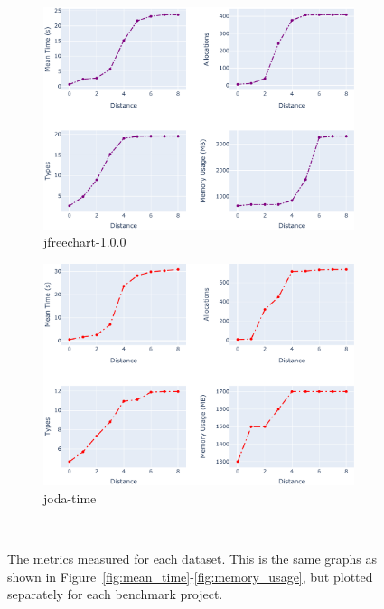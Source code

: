 \begin{figure}[htbp]
\begin{subfigure}[b]{0.45\textwidth}
\captionsetup{margin=0cm}  %
\includegraphics[width=\textwidth]{figures/jfreechart-1.0.0_distance_evaluation.pdf}
\caption{jfreechart-1.0.0}
\end{subfigure}
\vspace{0.5cm}
\hfill
\begin{subfigure}[b]{0.45\textwidth}
\captionsetup{margin=0cm}  %
\includegraphics[width=\textwidth]{figures/joda-time_distance_evaluation.pdf}
\caption{joda-time}
\end{subfigure}
\vspace{0.5cm}
\\
\caption{The metrics measured for each dataset. This is the same graphs as shown in Figure~\ref{fig:mean_time}-\ref{fig:memory_usage}, but plotted separately for each benchmark project.}
\label{fig:singles_result}
\end{figure}

